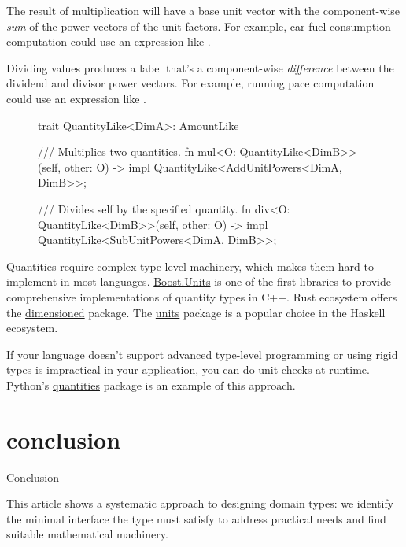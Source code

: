 \documentclass{article}
\begin{document}
The result of multiplication will have a base unit vector with the component-wise \emph{sum} of the power vectors of the unit factors.
For example, car fuel consumption computation could use an expression like .

Dividing values produces a label that's a component-wise \emph{difference} between the dividend and divisor power vectors.
For example, running pace computation could use an expression like .

\begin{figure}
\begin{code}[rust]
trait QuantityLike<DimA>: AmountLike {
  /// Multiplies two quantities.
  fn mul<O: QuantityLike<DimB>>(self, other: O)
    -> impl QuantityLike<AddUnitPowers<DimA, DimB>>;

  /// Divides self by the specified quantity.
  fn div<O: QuantityLike<DimB>>(self, other: O)
    -> impl QuantityLike<SubUnitPowers<DimA, DimB>>;
}
\end{code}
\end{figure}

Quantities require complex type-level machinery, which makes them hard to implement in most languages.
\href{https://www.boost.org/doc/libs/1_65_0/doc/html/boost_units.html}{Boost.Units} is one of the first libraries to provide comprehensive implementations of quantity types in C++.
Rust ecosystem offers the \href{https://crates.io/crates/dimensioned}{dimensioned} package.
The \href{https://hackage.haskell.org/package/units}{units} package is a popular choice in the Haskell ecosystem.

If your language doesn't support advanced type-level programming or using rigid types is impractical in your application, you can do unit checks at runtime.
Python's \href{https://github.com/python-quantities/python-quantities}{quantities} package is an example of this approach.

\section{conclusion}{Conclusion}

This article shows a systematic approach to designing domain types: we identify the minimal interface the type must satisfy to address practical needs and find suitable mathematical machinery.
\end{document}
